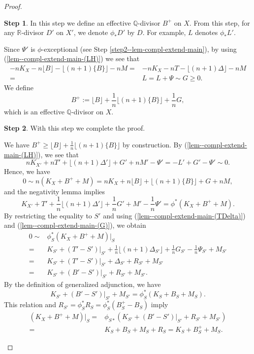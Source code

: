 \documentclass[12pt]{amsart}
\theoremstyle{definition}
\newtheorem{step1}{Step}
\begin{document}
\begin{proof}
\begin{step1}\label{step6--lem-compl-extend-main}
In this step we define an effective $\mathbb{Q}$-divisor $B^{+}$ on $X$. 
From this step, for any $\mathbb{R}$-divisor $D'$ on $X'$, we denote $\phi_{*}D'$ by $D$. 
For example, $L$ denotes $\phi_{*}L'$. 

Since $\Psi'$ is $\phi$-exceptional (see Step \ref{step2--lem-compl-extend-main}), by using (\ref{lem--compl-extend-main-(LH)}) we see that
\begin{equation*}
\begin{split}
-nK_{X}-n\lfloor B \rfloor-\lfloor (n+1)\{B\} \rfloor -nM
=&-nK_{X}-nT-\lfloor (n+1)\Delta \rfloor -nM \\
=&L=L+\Psi \sim G \geq 0.
\end{split}
\end{equation*}
We define 
$$B^{+}:=\lfloor B \rfloor+\frac{1}{n}\lfloor (n+1)\{B\}\rfloor+\frac{1}{n}G,$$
which is an effective $\mathbb{Q}$-divisor on $X$. 
\end{step1}

\begin{step1}\label{step7--lem-compl-extend-main}
With this step we complete the proof. 

We have $B^{+} \geq \lfloor B \rfloor+\frac{1}{n}\lfloor (n+1)\{B\}\rfloor$ by construction. 
By (\ref{lem--compl-extend-main-(LH)}), we see that
$$nK_{X'}+nT'+\lfloor (n+1)\Delta'\rfloor+G'+nM'-\Psi'=-L'+G'-\Psi'\sim0.$$
Hence, we have
$$0 \sim n(K_{X}+B^{+}+M)=nK_{X}+n\lfloor B \rfloor+\lfloor (n+1)\{B\}\rfloor +G+nM,$$
and the negativity lemma implies
$$K_{X'}+T'+ \frac{1}{n}\lfloor (n+1)\Delta'\rfloor+\frac{1}{n}G'+M'-\frac{1}{n}\Psi'=\phi^{*}(K_{X}+B^{+}+M).$$
By restricting the equality to $S'$ and using (\ref{lem--compl-extend-main-(TDelta)}) and (\ref{lem--compl-extend-main-(G)}), we obtain
\begin{equation*}
\begin{split}
0\sim &\phi^{*}_{S}(K_{X}+B^{+}+M)|_{S}\\
=&K_{S'}+(T'-S')|_{S'}+\frac{1}{n}\lfloor (n+1)\Delta_{S'}\rfloor+\frac{1}{n}G_{S'}-\frac{1}{n}\Psi_{S'}+M_{S'}\\
=&K_{S'}+(T'-S')|_{S'}+\Delta_{S'}+R_{S'}+M_{S'}\\
=&K_{S'}+(B'-S')|_{S'}+R_{S'}+M_{S'}.
\end{split}
\end{equation*}
By the definition of generalized adjunction, we have 
$$K_{S'}+(B'-S')|_{S'}+M_{S'}=\phi^{*}_{S}(K_{S}+B_{S}+M_{S}).$$
This relation and $R_{S'}=\phi^{*}_{S}R_{S}=\phi^{*}_{S}(B^{+}_{S}-B_{S})$ imply
\begin{equation*}
\begin{split}
(K_{X}+B^{+}+M)|_{S}=&\phi_{S*}(K_{S'}+(B'-S')|_{S'}+R_{S'}+M_{S'})\\
=&K_{S}+B_{S}+M_{S}+R_{S}=K_{S}+B^{+}_{S}+M_{S}. 
\end{split}
\end{equation*}


\end{step1}
\end{proof}
\end{document}
